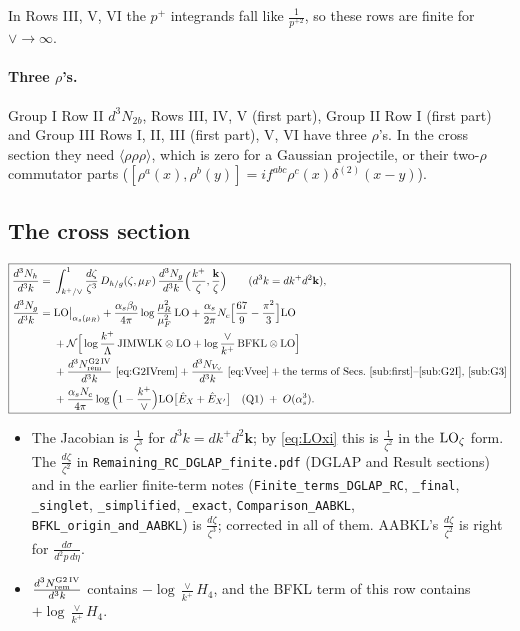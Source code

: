 \documentclass[10pt]{article}
\numberwithin{equation}{section}
\newcommand{\new}[1]{{\color{blue}#1}}
\newcommand{\old}[1]{{\color{red}#1}}
\newcommand{\LO}{{\rm LO}}
\begin{document}
In Rows III, V, VI the $p^+$ integrands fall like $\frac{1}{p^{+2}}$, so these rows are finite for $\vee\to\infty$.
\paragraph{Three $\rho$'s.} Group I Row II $d^3N_{2b}$, Rows III, IV, V (first part), Group II Row I (first part) and Group III Rows I, II, III (first part), V, VI have three $\rho$'s. In the cross section they need $\langle\rho\rho\rho\rangle$, which is zero for a Gaussian projectile, or their two-$\rho$ commutator parts ($[\rho^a(x),\rho^b(y)]=if^{abc}\rho^c(x)\delta^{(2)}(x-y)$).

\subsection{The cross section}
\begin{equation}
\boxed{\begin{aligned}
\frac{d^3N_h}{d^3k}={}&\int_{k^+/\vee}^1\frac{d\zeta}{\zeta^3}\,D_{h/g}(\zeta,\mu_F)\,\frac{d^3N_g}{d^3k}\Big(\frac{k^+}{\zeta},\frac{\mathbf k}{\zeta}\Big)\qquad(d^3k=dk^+d^2\mathbf k),\\
\frac{d^3N_g}{d^3k}={}&\LO\big|_{\alpha_s(\mu_R)}+\frac{\alpha_s\beta_0}{4\pi}\log\frac{\mu_R^2}{\mu_F^2}\,\LO+\frac{\alpha_s}{2\pi}N_c\Big[\frac{67}{9}-\frac{\pi^2}{3}\Big]\LO\\
&+\mathcal N\Big[\log\frac{k^+}{\Lambda}\,{\rm JIMWLK}\otimes\LO+\log\frac{\vee}{k^+}\,{\rm BFKL}\otimes\LO\Big]\\
&+\frac{d^3N^{\rm G2\,IV}_{\rm rem}}{d^3k}\ \text{\eqref{eq:G2IVrem}}+\frac{d^3N_{V_\vee}}{d^3k}\ \text{\eqref{eq:Vvee}}+\text{the terms of Secs.~\ref{sub:first}--\ref{sub:G2I}, \ref{sub:G3}}\\
&+\frac{\alpha_sN_c}{4\pi}\log\Big(1-\frac{k^+}{\vee}\Big)\LO\big[\hat E_X+\hat E_{X'}\big]\quad\text{(Q1)}\;+\;O(\alpha_s^3).
\end{aligned}}\label{eq:result}
\end{equation}
\begin{itemize}
\item The Jacobian is $\frac{1}{\zeta^3}$ for $d^3k=dk^+d^2\mathbf k$; by \eqref{eq:LOxi} this is $\frac{1}{\zeta^2}$ in the ${\rm LO}_\zeta$ form. \old{The $\frac{d\zeta}{\zeta^2}$} in \texttt{Remaining\_RC\_DGLAP\_finite.pdf} (DGLAP and Result sections) and in the earlier finite-term notes (\texttt{Finite\_terms\_DGLAP\_RC}, \texttt{\_final}, \texttt{\_singlet}, \texttt{\_simplified}, \texttt{\_exact}, \texttt{Comparison\_AABKL}, \texttt{BFKL\_origin\_and\_AABKL}) is \new{$\frac{d\zeta}{\zeta^3}$}; corrected in all of them. AABKL's $\frac{d\zeta}{\zeta^2}$ is right for $\frac{d\sigma}{d^2p\,d\eta}$.
\item $\frac{d^3N^{\rm G2\,IV}_{\rm rem}}{d^3k}$ contains $-\log\frac{\vee}{k^+}H_4$, and the BFKL term of this row contains $+\log\frac{\vee}{k^+}H_4$.
\end{itemize}
\end{document}
